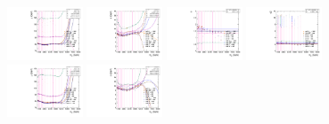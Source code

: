 \begin{figure}[htbp]
  \centering
  \includegraphics[width=0.2\textwidth]{fig/2Dfit/paramSignalShape_allSig_MJJ_HP_nobb_LDy_mean.pdf}
  \includegraphics[width=0.2\textwidth]{fig/2Dfit/paramSignalShape_allSig_MJJ_HP_nobb_LDy_sigma.pdf}
  \includegraphics[width=0.2\textwidth]{fig/2Dfit/paramSignalShape_allSig_MJJ_HP_nobb_LDy_alpha.pdf}
  \includegraphics[width=0.2\textwidth]{fig/2Dfit/paramSignalShape_allSig_MJJ_HP_nobb_LDy_alpha2.pdf}\\
  \includegraphics[width=0.2\textwidth]{fig/2Dfit/paramSignalShape_allSig_MJJ_LP_nobb_LDy_mean.pdf}
  \includegraphics[width=0.2\textwidth]{fig/2Dfit/paramSignalShape_allSig_MJJ_LP_nobb_LDy_sigma.pdf}

\end{figure}
